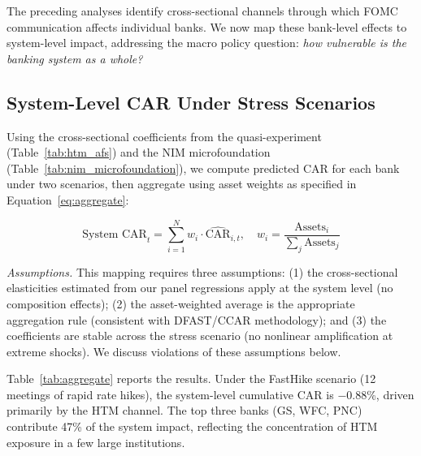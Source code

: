 \documentclass[12pt,a4paper]{article}
\begin{document}
The preceding analyses identify cross-sectional channels through which FOMC communication affects individual banks. We now map these bank-level effects to system-level impact, addressing the macro policy question: \textit{how vulnerable is the banking system as a whole?}

\subsection{System-Level CAR Under Stress Scenarios}

Using the cross-sectional coefficients from the quasi-experiment (Table~\ref{tab:htm_afs}) and the NIM microfoundation (Table~\ref{tab:nim_microfoundation}), we compute predicted CAR for each bank under two scenarios, then aggregate using asset weights as specified in Equation~\eqref{eq:aggregate}:

\begin{equation}
\text{System CAR}_t = \sum_{i=1}^{N} w_i \cdot \hat{\text{CAR}}_{i,t}, \quad w_i = \frac{\text{Assets}_i}{\sum_j \text{Assets}_j}
\end{equation}

\noindent\textit{Assumptions.} This mapping requires three assumptions: (1) the cross-sectional elasticities estimated from our panel regressions apply at the system level (no composition effects); (2) the asset-weighted average is the appropriate aggregation rule (consistent with DFAST/CCAR methodology); and (3) the coefficients are stable across the stress scenario (no nonlinear amplification at extreme shocks). We discuss violations of these assumptions below.

Table~\ref{tab:aggregate} reports the results. Under the FastHike scenario (12 meetings of rapid rate hikes), the system-level cumulative CAR is $-0.88$\%, driven primarily by the HTM channel. The top three banks (GS, WFC, PNC) contribute 47\% of the system impact, reflecting the concentration of HTM exposure in a few large institutions.
\end{document}
